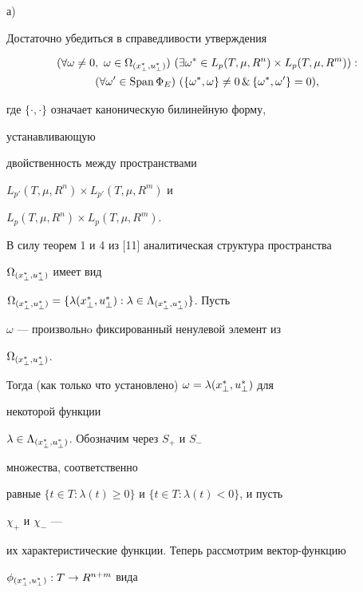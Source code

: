 \begin{pf} 


а) 


Достаточно убедиться в справедливости утверждения 


\begin{multline*} 


(\forall\omega\ne0,\ \omega\in\Omega_{\myxu{\bot}}) 


\ (\exists\omega^*\in L_p(T,\mu,R^n)\times 


L_p(T,\mu,R^m)): \\ 


(\forall\omega'\in\Span\Phi_E)\ (\{\omega^*,\omega\}\ne0\,\&\, 


\{\omega^*,\omega'\}=0), 


\end{multline*} 


где $\{\cdot,\cdot\}$ означает каноническую билинейную форму, 


устанавливающую 


двойственность между пространствами 


$L_{p'}(T,\mu,R^n)\times L_{p'}(T,\mu,R^m)$ и 


$L_{p}(T,\mu,R^n)\times L_{p}(T,\mu,R^m)$. 


 


В силу теорем 1 и 4 из [11] аналитическая структура пространства 


$\Omega_{{(x^*_{\bot},u^*_{\bot})}}$ имеет вид 


$\Omega_{\myxu{\bot}}=\{\lambda\myxu{\bot}:\lambda\in 


\Lambda_{\myxu{\bot}}\}$. Пусть 


$\omega$ --- произвольнo фиксированный ненулевой элемент из 


$\Omega_{{(x^*_{\bot},u^*_{\bot})}}$. 


Тогда (как только что установлено) $\omega=\lambda{(x^*_{\bot},u^*_{\bot})}$ для 


некоторой функции 


$\lambda\in\Lambda_{{(x^*_{\bot},u^*_{\bot})}}$. Обозначим через $S_+$ и $S_-$ 


множества, соответственно 


равные $\{t\in T:\lambda(t)\ge0\}$ и $\{t\in T:\lambda(t)<0\}$, и пусть 


$\chi_+$ и $\chi_-$ --- 


их характеристические функции. Теперь рассмотрим вектор-функцию 


$\phi_{{(x^*_{\bot},u^*_{\bot})}}:T\to R^{n+m}$ вида 



\end{pf}
